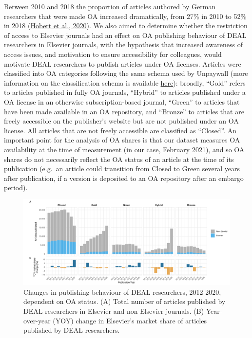 \documentclass[
]{article}
\begin{document}
Between 2010 and 2018 the proportion of articles authored by German researchers that were made OA increased dramatically, from 27\% in 2010 to 52\% in 2018 (\href{http://doi.org/10.5281/zenodo.3892951}{Hobert et al., 2020}). We also aimed to determine whether the restriction of access to Elsevier journals had an effect on OA publishing behaviour of DEAL researchers in Elsevier journals, with the hypothesis that increased awareness of access issues, and motivation to ensure accessibility for colleagues, would motivate DEAL researchers to publish articles under OA licenses. Articles were classified into OA categories following the same schema used by Unpaywall (more information on the classification schema is available \href{https://support.unpaywall.org/support/solutions/articles/44001777288-what-do-the-types-of-oa-status-green-gold-hybrid-and-bronze-mean-\#:~:text=Unpaywall\%20assigns\%20an\%20OA\%20Status,in\%20discussions\%20of\%20open\%20access.}{here}): broadly, ``Gold'' refers to articles published in fully OA journals, ``Hybrid'' to articles published under a OA license in an otherwise subscription-based journal, ``Green'' to articles that have been made available in an OA repository, and ``Bronze'' to articles that are freely accessible on the publisher's website but are not published under an OA license. All articles that are not freely accessible are classified as ``Closed''. An important point for the analysis of OA shares is that our dataset measures OA availability at the time of measurement (in our case, February 2021), and so OA shares do not necessarily reflect the OA status of an article at the time of its publication (e.g.~an article could transition from Closed to Green several years after publication, if a version is deposited to an OA repository after an embargo period).

\begin{figure}
\centering
\includegraphics{analysis_files/figure-latex/items-publisher-year-oa-1.pdf}
\caption{\label{fig:items-publisher-year-oa}Changes in publishing behaviour of DEAL researchers, 2012-2020, dependent on OA status. (A) Total number of articles published by DEAL researchers in Elsevier and non-Elsevier journals. (B) Year-over-year (YOY) change in Elsevier's market share of articles published by DEAL researchers.}
\end{figure}
\end{document}
